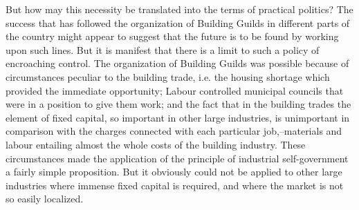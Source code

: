 \documentclass{book}
\begin{document}
But how may this necessity be translated into the terms of practical politics? The success that has followed the organization of Building Guilds in different parts of the country might appear to suggest that the future is to be found by working upon such lines. But it is manifest that there is a limit to such a policy of encroaching control. The organization of Building Guilds was possible because of circumstances peculiar to the building trade, i.e. the housing shortage which provided the immediate opportunity; Labour controlled municipal councils that were in a position to give them work; and the fact that in the building trades the element of fixed capital, so important in other large industries, is unimportant in comparison with the charges connected with each particular job,–materials and labour entailing almost the whole costs of the building industry. These circumstances made the application of the principle of industrial self-government a fairly simple proposition. But it obviously could not be applied to other large industries where immense fixed capital is required, and where the market is not so easily localized.
\end{document}
